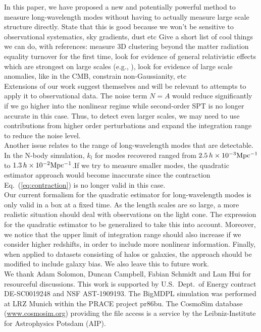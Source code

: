 \documentclass[prd,amsmath,amssymb,floatfix,superscriptaddress,nofootinbib,twocolumn]{revtex4-1}
\newcommand{\ec}[1]{Eq.~(\ref{eq:#1})}
\newcommand{\RC}[1]{{\color{darkorange} #1}}
\begin{document}
\label{sec4}
In this paper, we have proposed a new and potentially powerful method to measure long-wavelength modes without having to actually measure large scale structure directly.
\RC{ State that this is good because we won't be sensitive to observational systematics, sky gradients, dust etc}
\RC{Give a short list of cool things we can do, with references: measure 3D clustering beyond the matter radiation equality turnover for the first time, look for evidence of general relativistic effects which are strongest on large scales (e.g., \cite{Jeong:2012ls}), look for evidence of large scale anomalies, like in the CMB, constrain non-Gaussianity,  etc }\\
Extensions of our work suggest themselves and will be relevant to attempts to apply it to observational data. The noise term $N=A$ would reduce significantly if we go higher into the nonlinear regime while second-order SPT is no longer accurate in this case. Thus, to detect even larger scales, we may need to use contributions from higher order perturbations and expand the integration range to reduce the noise level. \\
Another issue relates to the range of long-wavelength modes that are detectable. In the N-body simulation,  $k_l$ for modes recovered ranged from $2.5 \,h \times 10^{-3}  \rm Mpc^{-1}$ to $1.3\,h\times 10^{-2}  \rm Mpc^{-1}$.If we try to measure smaller modes, the quadratic estimator approach would become inaccurate since the contraction \ec{contraction} is no longer valid in this case.\\ 
Our current formalism for the quadratic estimator for long-wavelength modes is only valid in a box at a fixed time. As the length scales are so large, a more realistic situation should deal with observations on the light cone. The expression for the quadratic estimator to be generalized to take this into account. Moreover, we notice that the upper limit of integration range should also increase if we consider higher redshifts, in order to include more nonlinear information. Finally, when applied to datasets consisting of halos or galaxies, the approach should be modified to include galaxy bias. We also leave this to future work.\\ 

\noindent We thank Adam Solomon, Duncan Campbell, Fabian Schmidt and Lam Hui for resourceful discussions.  This work is supported by U.S.\ Dept.\ of Energy contract DE-SC0019248 and NSF AST-1909193.
The BigMDPL simulation was performed at LRZ Munich within the PRACE project pr86bu. The CosmoSim database (\url{www.cosmosim.org}) providing the file access is a service by the Leibniz-Institute for Astrophysics Potsdam (AIP).

%


\end{document}
